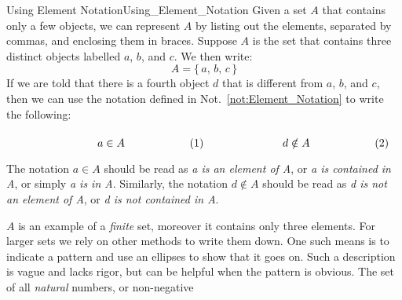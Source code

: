     \begin{fexample}{Using Element Notation}{Using_Element_Notation}
        Given a set $A$ that contains only a few objects, we can represent $A$
        by listing out the elements, separated by commas, and enclosing them in
        braces. Suppose $A$ is the set that contains three distinct objects
        labelled $a$, $b$, and $c$. We then write:
        \begin{equation}
            A=\big\{\,a,\,b,\,c\,\big\}
        \end{equation}
        If we are told that there is a fourth object $d$ that is different from
        $a$, $b$, and $c$, then we can use the notation defined in
        Not.~\ref{not:Element_Notation} to write the following:
        \par\hfill\par
        \begin{subequations}
            \begin{minipage}[b]{0.49\textwidth}
                \begin{equation}
                    a\in{A}
                \end{equation}
            \end{minipage}
            \hfill
            \begin{minipage}[b]{0.49\textwidth}
                \begin{equation}
                    d\notin{A}
                \end{equation}
            \end{minipage}
        \end{subequations}
        \par\vspace{2.5ex}
        The notation $a\in{A}$ should be read as \textit{a is an element of A},
        or \textit{a is contained in A}, or simply \textit{a is in A}.
        Similarly, the notation $d\notin{A}$ should be read as
        \textit{d is not an element of A}, or \textit{d is not contained in A}.
        \par\hfill\par
        $A$ is an example of a \textit{finite} set, moreover
        it contains only three elements. For larger sets we rely on other
        methods to write them down. One such means is to indicate a pattern and
        use an ellipses to show that it goes on. Such a description is vague and
        lacks rigor, but can be helpful when the pattern is obvious. The set of
        all \textit{natural} numbers, or non-negative

\end{fexample}
